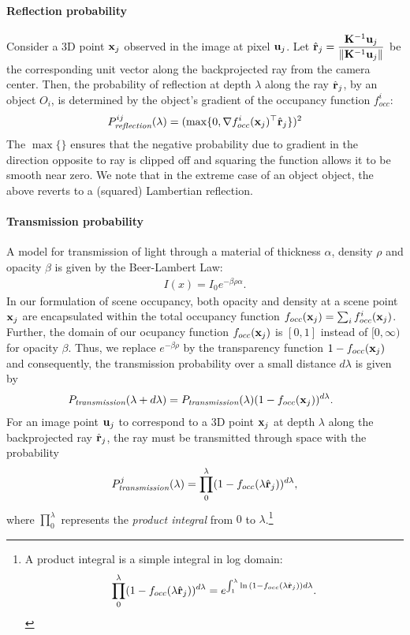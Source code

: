 \paragraph{Reflection probability}
Consider a 3D point $\mathbf{x}_j$ observed in the image at pixel $\mathbf{u}_j$. Let $\hat{\mathbf{r}}_j = \displaystyle\frac{\mathbf{K}^{-1}\mathbf{u}_j}{\lVert \mathbf{K}^{-1}\mathbf{u}_j \rVert}$ be the corresponding unit vector along the backprojected ray from the camera center. Then, the probability of reflection at depth $\lambda$ along the ray $\hat{\mathbf{r}}_j$, by an object $O_i$, is determined by the object's gradient of the occupancy function $f_{occ}^i$:
\begin{align}
  P^{ij}_{\textit{reflection}} (\lambda) = (\max \{0, \nabla {f^i_{occ}}(\mathbf{x}_j)^\top \hat{\mathbf{r}}_j \})^2
\end{align}
The $\max \{ \}$ ensures that the negative probability due to gradient in the direction opposite to ray is clipped off and squaring the function allows it to be smooth near zero. We note that in the extreme case of an object object, the above reverts to a (squared) Lambertian reflection.


\paragraph{Transmission probability}
A model for transmission of light through a material of thickness $\alpha$, density $\rho$ and opacity $\beta$ is given by the Beer-Lambert Law:
\begin{align}
I(x) = I_0 e^{-\beta\rho\alpha}.
\end{align}
%
In our formulation of scene occupancy, both opacity and density at a scene point $\mathbf{x}_j$ are encapsulated within the total occupancy function $f_{occ}(\mathbf{x}_j) = \sum_i f^i_{occ}(\mathbf{x}_j)$. Further, the domain of our ocupancy function $f_{occ}(\mathbf{x}_j)$ is $[0, 1]$ instead of $[0, \infty)$ for opacity $\beta$. Thus, we replace $e^{-\beta\rho}$ by the transparency function $1 - f_{occ}(\mathbf{x}_j)$ and consequently, the transmission probability over a small distance $d\lambda$ is given by
%
\begin{align}
  \!\!\!\! P_{\textit{transmission}}(\lambda + d\lambda) = P_{\textit{transmission}}(\lambda) (1-f_{occ}(\mathbf{x}_j))^{d\lambda}.
\end{align}
%
For an image point $\mathbf{u}_j$ to correspond to a 3D point $\mathbf{x}_j$ at depth $\lambda$ along the backprojected ray $\hat{\mathbf{r}}_j$, the ray must be transmitted through space with the probability
\begin{align}
P^j_{\textit{transmission}}(\lambda) = \prod_{0}^{\lambda} (1 - f_{occ}(\lambda \hat{\mathbf{r}}_j))^{d\lambda},
\label{eq:ptrans-integral}
\end{align}
where $\displaystyle\prod_{0}^{\lambda}$ represents the \emph{product integral} from $0$ to $\lambda$.\footnote{A product integral is a simple integral in log domain: 
\vspace{-0.2cm}
\begin{equation}
\prod_{0}^{\lambda} (1 - f_{occ}(\lambda \hat{\mathbf{r}}_j))^{d\lambda} = e^{\int_{1}^{\lambda} \ln{(1 - f_{occ}(\lambda \hat{\mathbf{r}}_j))}{d\lambda}}. \nonumber
\end{equation}
}

